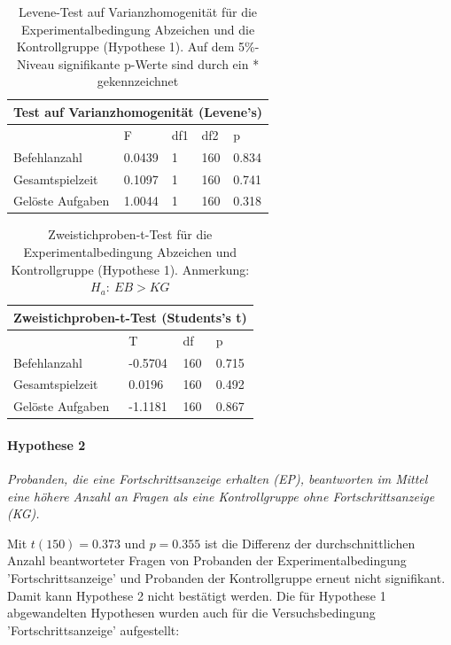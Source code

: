 \begin{table}[htbp]
\centering
\begin{tabular}{ |p{4cm}||p{2.0cm}|p{2.0cm}|p{2.0cm}|p{2.0cm}| }
 \hline
 \multicolumn{5}{|c|}{Test auf Varianzhomogenität (Levene's)} \\
 \hline
 & F & df1 &df2 &p \\
 \hline
  Befehlanzahl      & 0.0439    & 1 &   160 & 0.834\\
  Gesamtspielzeit   & 0.1097    & 1 &   160 & 0.741\\
  Gelöste Aufgaben  & 1.0044    & 1 &   160 & 0.318\\
 \hline
\end{tabular}
\caption{Levene-Test auf Varianzhomogenität für die Experimentalbedingung Abzeichen und die Kontrollgruppe (Hypothese 1). Auf dem 5\%-Niveau signifikante p-Werte sind durch ein * gekennzeichnet}
\label{levene_hypo_1}
\end{table}
\begin{table}[htbp]
\centering
\begin{tabular}{ |p{4cm}||p{2.0cm}|p{2.0cm}|p{2.0cm}| }
 \hline
 \multicolumn{4}{|c|}{Zweistichproben-t-Test (Students's t)} \\
 \hline
 & T &df & p \\
 \hline
  Befehlanzahl       & -0.5704  &   160 & 0.715\\
  Gesamtspielzeit    &  0.0196  &   160 & 0.492\\
  Gelöste Aufgaben   & -1.1181  &   160 & 0.867\\
 \hline
\end{tabular}
\caption{Zweistichproben-t-Test für die Experimentalbedingung Abzeichen und Kontrollgruppe (Hypothese 1). Anmerkung: $H_a:\: EB > KG$}
\label{ttest_hypo_1}
\end{table}



\paragraph{Hypothese 2 }
\begin{center}
    \textit{Probanden, die eine Fortschrittsanzeige erhalten (EP), beantworten im Mittel eine höhere Anzahl an Fragen als eine Kontrollgruppe ohne Fortschrittsanzeige (KG).} 
\end{center}
Mit $t(150)=0.373$ und $p=0.355$ ist die Differenz der durchschnittlichen Anzahl beantworteter Fragen von Probanden der Experimentalbedingung 'Fortschrittsanzeige' und Probanden der Kontrollgruppe erneut nicht signifikant. Damit kann Hypothese 2 nicht bestätigt werden. Die für Hypothese 1 abgewandelten Hypothesen wurden auch für die Versuchsbedingung 'Fortschrittsanzeige' aufgestellt: 

